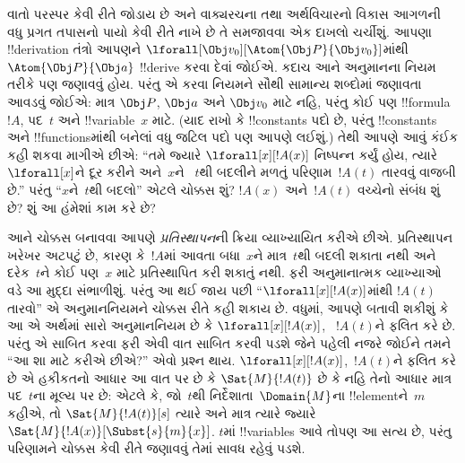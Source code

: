 \documentclass[../../../include/open-logic-section]{subfiles}
\begin{document}


વાતો પરસ્પર કેવી રીતે જોડાય છે અને વાક્યરચના તથા અર્થવિચારનો વિકાસ
આગળની વધુ પ્રગત તપાસનો પાયો કેવી રીતે નાખે છે તે સમજાવવા એક દાખલો
ચર્ચીશું. આપણા !!{derivation} તંત્રો આપણને
$\lforall[\Obj v_0][\Atom{\Obj P}{\Obj v_0}]$માંથી
$\Atom{\Obj P}{\Obj a}$ !!{derive} કરવા દેવાં જોઈએ. કદાચ આને
અનુમાનના નિયમ તરીકે પણ જણાવવું હોય. પરંતુ એ કરવા નિયમને સૌથી સામાન્ય
શબ્દોમાં જણાવતા આવડવું જોઈએ: માત્ર $\Obj P$, $\Obj a$ અને $\Obj v_0$
માટે નહિ, પરંતુ કોઈ પણ !!{formula}~$!A$, પદ~$t$ અને !!{variable}~$x$
માટે. (યાદ રાખો કે !!{constant}s પદો છે, પરંતુ !!{constant}s અને
!!{function}sમાંથી બનેલાં વધુ જટિલ પદો પણ આપણે લઈશું.) તેથી આપણે
આવું કંઈક કહી શકવા માગીએ છીએ: ``તમે જ્યારે $\lforall[x][!A(x)]$
નિષ્પન્ન કર્યું હોય, ત્યારે $\lforall[x]$ને દૂર કરીને અને~$x$ને
~$t$થી બદલીને મળતું પરિણામ~$!A(t)$ તારવવું વાજબી છે.'' પરંતુ
``$x$ને~$t$થી બદલો'' એટલે ચોક્કસ શું? $!A(x)$ અને~$!A(t)$ વચ્ચેનો
સંબંધ શું છે? શું આ હંમેશાં કામ કરે છે?

આને ચોક્કસ બનાવવા આપણે \emph{પ્રતિસ્થાપન}ની ક્રિયા વ્યાખ્યાયિત કરીએ
છીએ. પ્રતિસ્થાપન ખરેખર અટપટું છે, કારણ કે~$!A$માં આવતા બધા~$x$ને
માત્ર~$t$થી બદલી શકાતા નથી અને દરેક~$t$ને કોઈ પણ~$x$ માટે
પ્રતિસ્થાપિત કરી શકાતું નથી. ફરી અનુમાનાત્મક વ્યાખ્યાઓ વડે આ મુદ્દા
સંભાળીશું. પરંતુ આ થઈ જાય પછી ``$\lforall[x][!A(x)]$માંથી $!A(t)$
તારવો'' એ અનુમાનનિયમને ચોક્કસ રીતે કહી શકાય છે. વધુમાં, આપણે બતાવી
શકીશું કે આ એ અર્થમાં સારો અનુમાનનિયમ છે કે $\lforall[x][!A(x)]$,
~$!A(t)$ને ફલિત કરે છે. પરંતુ એ સાબિત કરવા ફરી એવી વાત સાબિત કરવી
પડશે જેને પહેલી નજરે જોઈને તમને ``આ શા માટે કરીએ છીએ?'' એવો પ્રશ્ન
થાય. $\lforall[x][!A(x)]$,~$!A(t)$ને ફલિત કરે છે એ હકીકતનો આધાર આ
વાત પર છે કે $\Sat{M}{!A(t)}$ છે કે નહિ તેનો આધાર માત્ર પદ~$t$ના
મૂલ્ય પર છે: એટલે કે, જો~$t$થી નિર્દેશાતા~$\Domain{M}$ના
!!{element}ને~$m$ કહીએ, તો $\Sat{M}{!A(t)}[s]$ ત્યારે અને માત્ર ત્યારે
જ્યારે $\Sat{M}{!A(x)}[\Subst{s}{m}{x}]$. $t$માં !!{variable}s આવે
તોપણ આ સત્ય છે, પરંતુ પરિણામને ચોક્કસ કેવી રીતે જણાવવું તેમાં સાવધ
રહેવું પડશે.
\end{document}
